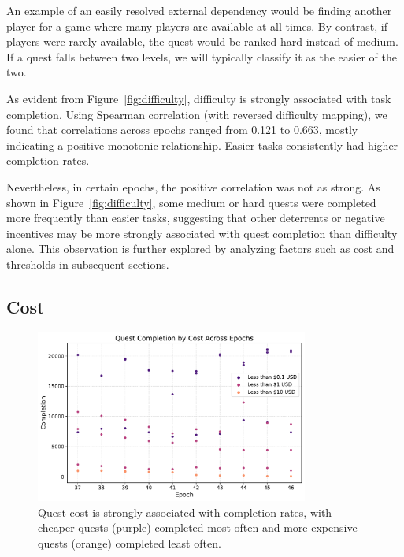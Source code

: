 An example of an easily resolved external dependency would be finding another player for a game where many players are available at all times. By contrast, if players were rarely available, the quest would be ranked hard instead of medium. If a quest falls between two levels, we will typically classify it as the easier of the two. 

As evident from Figure~\ref{fig:difficulty}, difficulty is strongly associated with task completion. Using Spearman correlation (with reversed difficulty mapping), we found that correlations across epochs ranged from 0.121 to 0.663, mostly indicating a positive monotonic relationship. Easier tasks consistently had higher completion rates. 

Nevertheless, in certain epochs, the positive correlation was not as strong. As shown in Figure~\ref{fig:difficulty}, some medium or hard quests were completed more frequently than easier tasks, suggesting that other deterrents or negative incentives may be more strongly associated with quest completion than difficulty alone. This observation is further explored by analyzing factors such as cost and thresholds in subsequent sections.


\subsection{Cost}

\begin{figure}[t]
    \centering
    \includegraphics[width=0.8\textwidth]{figures/cost.pdf}
    \caption{Quest cost is strongly associated with completion rates, with cheaper quests (purple) completed most often and more expensive quests (orange) completed least often.\label{fig:cost}}
\end{figure}

